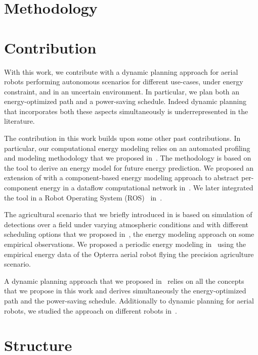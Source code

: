 \section{\color{red}Methodology}


\section{Contribution}

With this work, we contribute with a dynamic planning approach for aerial robots performing autonomous scenarios for different use-cases, under energy constraint, and in an uncertain environment. In particular, we plan both an energy-optimized path and a power-saving schedule. Indeed dynamic planning that incorporates both these aspects simultaneously is underrepresented in the literature. 

The contribution in this work builds upon some other past contributions. In particular, our computational energy modeling relies on an automated profiling and modeling methodology that we proposed in~\citep{seewald2019coarse}. The methodology is based on the \powprof{} tool to derive an energy model for future energy prediction. We proposed an extension of \powprof{} with a component-based energy modeling approach to abstract per-component energy in a dataflow computational network in~\citep{seewald2019component}. We later integrated the tool in a Robot Operating System (ROS)~\citep{quigley2009ros} in~\citep{zamanakos2020energy}.

The agricultural scenario that we briefly introduced in  is based on simulation of detections over a field under varying atmospheric conditions and with different scheduling options that we proposed in~\citep{zamanakos2020energy}, the energy modeling approach on some empirical observations. We proposed a periodic energy modeling in~\citep{seewald2020mechanical} using the empirical energy data of the Opterra aerial robot flying the precision agriculture scenario. 

A dynamic planning approach that we proposed in~\citep{seewald202Xenergy} relies on all the concepts that we propose in this work and derives simultaneously the energy-optimized path and the power-saving schedule. Additionally to dynamic planning for aerial robots, we studied the approach on different robots in~\citep{seewald2020beyond}.


\section{Structure}
\label{sec:structure}

